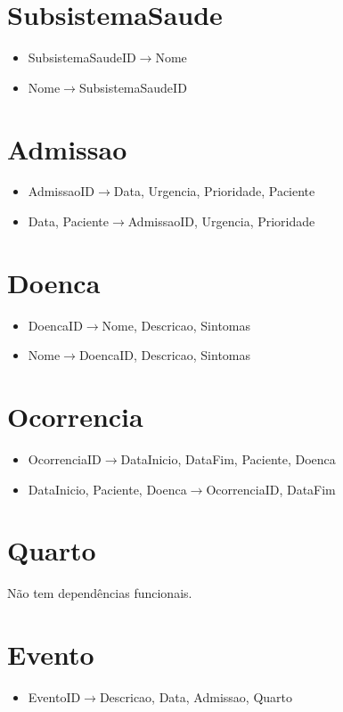 \documentclass[article, a4paper, 12pt, oneside]{memoir}
\begin{document}
\section*{SubsistemaSaude}
\begin{itemize}
	\item SubsistemaSaudeID$\rightarrow$Nome
	\item Nome$\rightarrow$SubsistemaSaudeID
\end{itemize}

\section*{Admissao}
\begin{itemize}
	\item AdmissaoID$\rightarrow$Data, Urgencia, Prioridade, Paciente
	\item Data, Paciente$\rightarrow$AdmissaoID, Urgencia, Prioridade
\end{itemize}

\section*{Doenca}
\begin{itemize}
	\item DoencaID$\rightarrow$Nome, Descricao, Sintomas
	\item Nome$\rightarrow$DoencaID, Descricao, Sintomas
\end{itemize}

\section*{Ocorrencia}
\begin{itemize}
	\item OcorrenciaID$\rightarrow$DataInicio, DataFim, Paciente, Doenca
	\item DataInicio, Paciente, Doenca$\rightarrow$OcorrenciaID, DataFim
\end{itemize}

\section*{Quarto}
Não tem dependências funcionais.

\section*{Evento}
\begin{itemize}
	\item EventoID$\rightarrow$Descricao, Data, Admissao, Quarto
\end{itemize}
\end{document}
